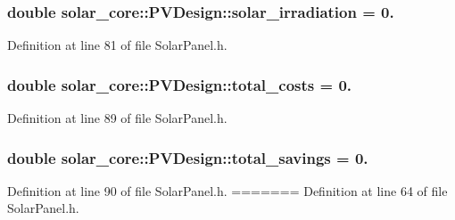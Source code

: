 \hypertarget{classsolar__core_1_1_p_v_design_ae74d98b592c49c7bb44a2e2ec07093c4}{}
\subsubsection[{solar\+\_\+irradiation}]{\setlength{\rightskip}{0pt plus 5cm}double solar\+\_\+core\+::\+P\+V\+Design\+::solar\+\_\+irradiation = 0.}\label{classsolar__core_1_1_p_v_design_ae74d98b592c49c7bb44a2e2ec07093c4}


Definition at line 81 of file Solar\+Panel.\+h.

\hypertarget{classsolar__core_1_1_p_v_design_ac015f1cf090279e45861f2860f008cc2}{}
\subsubsection[{total\+\_\+costs}]{\setlength{\rightskip}{0pt plus 5cm}double solar\+\_\+core\+::\+P\+V\+Design\+::total\+\_\+costs = 0.}\label{classsolar__core_1_1_p_v_design_ac015f1cf090279e45861f2860f008cc2}


Definition at line 89 of file Solar\+Panel.\+h.

\hypertarget{classsolar__core_1_1_p_v_design_a7628fe2e1ea95f8df79aca11dd5a356d}{}
\subsubsection[{total\+\_\+savings}]{\setlength{\rightskip}{0pt plus 5cm}double solar\+\_\+core\+::\+P\+V\+Design\+::total\+\_\+savings = 0.}\label{classsolar__core_1_1_p_v_design_a7628fe2e1ea95f8df79aca11dd5a356d}


Definition at line 90 of file Solar\+Panel.\+h.
=======
Definition at line 64 of file Solar\+Panel.\+h.

\hypertarget{classsolar__core_1_1_p_v_design_ac1220011d65d7cc442cd143f93123f31}{}
